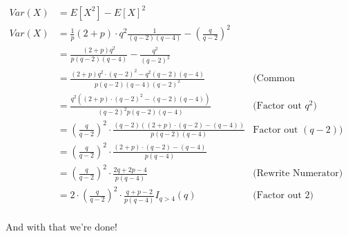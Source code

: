 \vspace{-3mm}
\begin{align*}
	Var(X) &= E[X^2] - E[X]^2 \\
	Var(X) &= \frac{1}{p}(2+p) \cdot q^2 \frac{1}{(q-2)(q-4)} - \left( \frac{q}{q-2} \right)^2 \\
	&= \frac{(2+p)q^2}{p(q-2)(q-4)} - \frac{q^2}{(q-2)^2} \\
	&= \frac{(2+p)q^2 \cdot (q-2)^2 - q^2(q-2)(q-4) }{p(q-2)(q-4)(q-2)^2} & \text{(Common denominators)} \\
	&= \frac{q^2((2+p) \cdot (q-2)^2 - (q-2)(q-4)) }{(q-2)^2p(q-2)(q-4)} & \text{(Factor out }q^2) \\
	&= \left( \frac{q}{q-2} \right)^2 \cdot  \frac{(q-2)( (2+p) \cdot (q-2) - (q-4)) }{p(q-2)(q-4)} & \text{Factor out } (q-2)) \\ 
	&= \left( \frac{q}{q-2} \right)^2 \cdot  \frac{(2+p) \cdot (q-2) - (q-4) }{p(q-4)} \\ 
	&= \left( \frac{q}{q-2} \right)^2 \cdot  \frac{2q+2p-4 }{p(q-4)} & \text{(Rewrite Numerator)} \\
	&= 2 \cdot \left( \frac{q}{q-2} \right)^2 \cdot  \frac{q+p-2 }{p(q-4)} I_{q > 4}(q) & \text{(Factor out 2)} \\
\end{align*}

And with that we're done!
